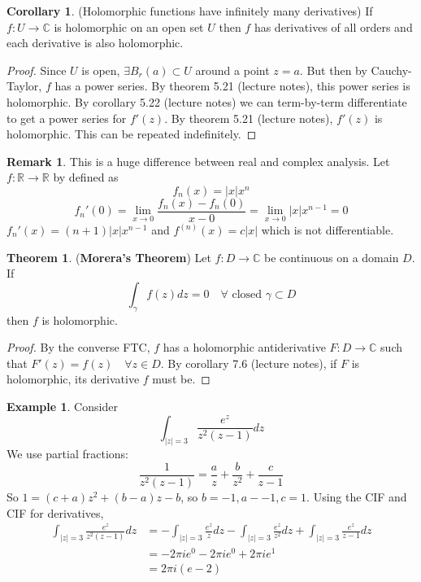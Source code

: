 \documentclass[12pt,a4paper]{article}
\theoremstyle{definition}
\newtheorem{theorem}[definition]{Theorem}
\newtheorem{corollary}[definition]{Corollary}
\newtheorem{example}[definition]{Example}
\newtheorem*{remark}{Remark}
\begin{document}
\begin{corollary}
	(Holomorphic functions have infinitely many derivatives) If $f: U \rightarrow \mathbb{C}$ is holomorphic on an open set $U$ then $f$ has derivatives of all orders and each derivative is also holomorphic.
\end{corollary}

\begin{proof}
	Since $U$ is open, $\exists B_r(a) \subset U$ around a point $z = a$. But then by Cauchy-Taylor, $f$ has a power series. By theorem 5.21 (lecture notes), this power series is holomorphic. By corollary 5.22 (lecture notes) we can term-by-term differentiate to get a power series for $f'(z)$. By theorem 5.21 (lecture notes), $f'(z)$ is holomorphic. This can be repeated indefinitely.
\end{proof}

\begin{remark}
	This is a huge difference between real and complex analysis. Let $f: \mathbb{R} \rightarrow \mathbb{R}$ by defined as
	\[
		f_n(x) = |x| x^n
	\]
	\[
		f_n'(0) = \lim_{x \rightarrow 0} \frac{f_n(x) - f_n(0)}{x - 0} = \lim_{x \rightarrow 0} |x| x^{n - 1} = 0
	\]
	$f_n'(x) = (n + 1) |x| x^{n - 1}$ and $f^{(n)} (x) = c|x|$ which is not differentiable.
\end{remark}

\begin{theorem}
	(\textbf{Morera's Theorem}) Let $f: D \rightarrow \mathbb{C}$ be continuous on a domain $D$. If
	\[
		\int_{\gamma} f(z) dz = 0 \quad \forall \text{ closed } \gamma \subset D
	\]
	then $f$ is holomorphic.
\end{theorem}

\begin{proof}
	By the converse FTC, $f$ has a holomorphic antiderivative $F: D \rightarrow \mathbb{C}$ such that $F'(z) = f(z) \quad \forall z \in D$. By corollary 7.6 (lecture notes), if $F$ is holomorphic, its derivative $f$ must be.
\end{proof}

\begin{example}
	Consider
	\[
		\int_{|z| = 3} \frac{e^z}{z^2 (z - 1)} dz
	\]
	We use partial fractions:
	\[
		\frac{1}{z^2 (z - 1)} = \frac{a}{z} + \frac{b}{z^2} + \frac{c}{z - 1}
	\]
	So $1 = (c + a) z^2 + (b - a) z - b$, so $b = -1, a - -1, c = 1$. Using the CIF and CIF for derivatives,
	\[
		\begin{aligned}
			\int_{|z| = 3} \frac{e^z}{z^2 (z - 1)} dz
				& = -\int_{|z| = 3} \frac{e^z}{z} dz - \int_{|z| = 3} \frac{e^z}{z^2} dz + \int_{|z| = 3} \frac{e^z}{z - 1} dz \\
				& = -2 \pi i e^0 - 2 \pi i e^0 + 2 \pi i e^1 \\
				& = 2 \pi i (e - 2)
		\end{aligned}
	\]
\end{example}
\end{document}

